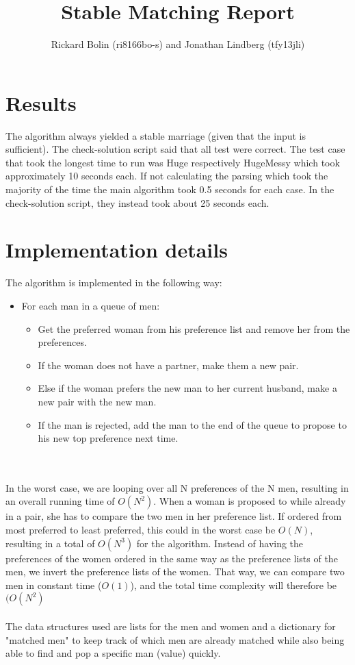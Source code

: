 \documentclass{article}
\title{Stable Matching Report}
\author{Rickard Bolin (ri8166bo-s) and Jonathan Lindberg (tfy13jli)}
\begin{document}
\maketitle
\section{Results}
The algorithm always yielded a stable marriage (given that the input is sufficient). The check-solution script said that all test were correct. The test case that took the longest time to run was Huge respectively HugeMessy which took approximately 10 seconds each. If not calculating the parsing which took the majority of the time the main algorithm took 0.5 seconds for each case. In the check-solution script, they instead took about 25 seconds each.

\section{Implementation details}

The algorithm is implemented in the following way:\\
\begin{itemize}
    \item For each man in a queue of men:
    \begin{itemize}
        \item Get the preferred woman from his preference list and remove her from the preferences.
        \item If the woman does not have a partner, make them a new pair.
        \item Else if the woman prefers the new man to her current husband, make a new pair with the new man.
        \item If the man is rejected, 
        add the man to the end of the queue to propose to his new top preference next time.
    \end{itemize}
\end{itemize}
\\
\\
In the worst case, we are looping over all N preferences of the N men, resulting in an overall running time of $O(N^2)$. When a woman is proposed to while already in a pair, she has to compare the two men in her preference list. If ordered from most preferred to least preferred, this could in the worst case be $O(N)$, resulting in a total of $O(N^3)$ for the algorithm. Instead of having the preferences of the women ordered in the same way as the preference lists of the men, we invert the preference lists of the women. That way, we can compare two men in constant time ($O(1)$), and the total time complexity will therefore be $(O(N^2)$
\\
\\
The data structures used are lists for the men and women and a dictionary for "matched men" to keep track of which men are already matched while also being able to find and pop a specific man (value) quickly.
\end{document}
